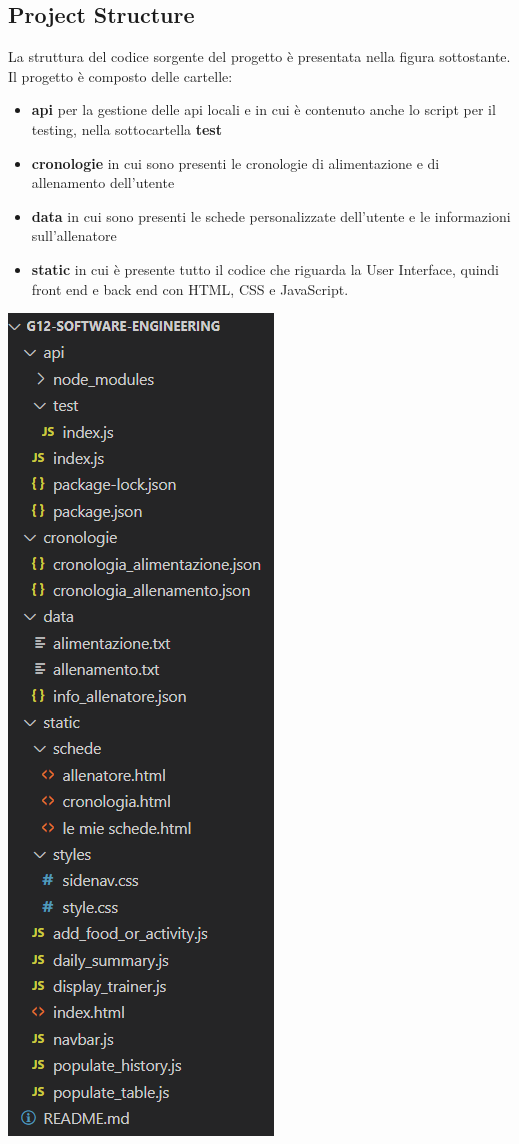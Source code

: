 \documentclass{article}
\begin{document}
   \subsection{Project Structure}
   La struttura del codice sorgente del progetto è presentata nella figura sottostante. Il progetto è composto delle cartelle:
   \begin{itemize}
      \item \textbf{api} per la gestione delle api locali e in cui è contenuto anche lo script per il testing, nella sottocartella \textbf{test}
      \item \textbf{cronologie} in cui sono presenti le cronologie di alimentazione e di allenamento dell’utente
      \item \textbf{data} in cui sono presenti le schede personalizzate dell’utente e le informazioni sull’allenatore
      \item \textbf{static} in cui è presente tutto il codice che riguarda la User Interface, quindi front end e back end con HTML, CSS e JavaScript.
   \end{itemize}
   \begin{center}
      \includegraphics[scale=0.5]{struttura.png}
   \end{center}
\end{document}
